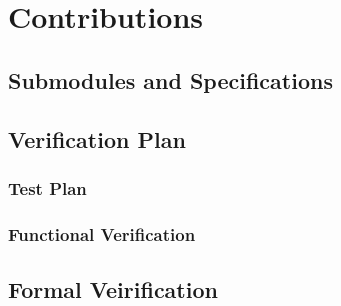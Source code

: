 \chapter{Contributions}
\section{Submodules and Specifications}

\section{Verification Plan}
\subsection{Test Plan}
\subsection{Functional Verification}

\section{Formal Veirification}

